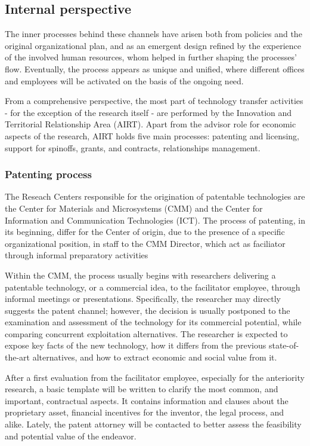 \subsection{Internal perspective}

The inner processes behind these channels have arisen both from policies and the original organizational plan, and as an emergent design refined by the experience of the involved human resources, whom helped in further shaping the processes' flow. Eventually, the process appears as unique and unified, where different offices and employees will be activated on the basis of the ongoing need. 

From a comprehensive perspective, the most part of technology transfer activities - for the exception of the research itself - are performed by the Innovation and Territorial Relationship Area (AIRT). Apart from the advisor role for economic aspects of the research, AIRT holds five main processes: patenting and licensing, support for spinoffs, grants, and contracts, relationships management.

\subsubsection{Patenting process}

The Reseach Centers responsible for the origination of patentable technologies are the Center for Materials and Microsystems (CMM) and the Center for Information and Communication Technologies (ICT). The process of patenting, in its beginning, differ for the Center of origin, due to the presence of a specific organizational position, in staff to the CMM Director, which act as faciliator through informal preparatory activities

Within the CMM, the process usually begins with researchers delivering a patentable technology, or a commercial idea, to the facilitator employee, through informal meetings or presentations. Specifically, the researcher may directly suggests the patent channel; however, the decision is usually postponed to the examination and assessment of the technology for its commercial potential, while comparing concurrent exploitation alternatives. The researcher is expected to expose key facts of the new technology, how it differs from the previous state-of-the-art alternatives, and how to extract economic and social value from it. 

After a first evaluation from the facilitator employee, especially for the anteriority research, a basic template will be written to clarify the most common, and important, contractual aspects. It contains information and clauses about the proprietary asset, financial incentives for the inventor, the legal process, and alike. Lately, the patent attorney will be contacted to better assess the feasibility and potential value of the endeavor. 

